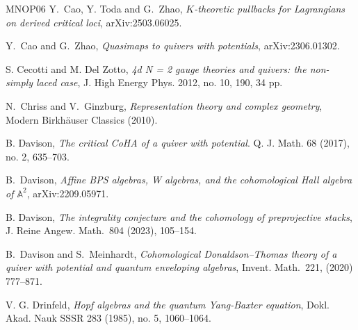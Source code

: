 \documentclass[10pt]{amsart}
\theoremstyle{definition}
\numberwithin{equation}{section}
\begin{document}
\begin{thebibliography}{MNOP06}
 Y.~Cao, Y. Toda and G.~Zhao, \textit{$K$-theoretic pullbacks for Lagrangians on derived critical loci}, arXiv:2503.06025.


 Y.~Cao and G.~Zhao, \textit{Quasimaps to quivers with potentials}, arXiv:2306.01302. 



 S. Cecotti and M. Del Zotto, \textit{4d N = 2 gauge theories and quivers: the non-simply laced case}, J. High Energy Phys. 2012, no. 10, 190, 34 pp.


 N.~Chriss and V.~Ginzburg, \textit{Representation theory and complex geometry}, Modern Birkh\"auser Classics (2010).



B. Davison, \textit{The critical CoHA of a quiver with potential}. Q. J. Math. 68 (2017), no. 2, 635--703. 

 B.~Davison, \textit{Affine BPS algebras, W algebras, and the cohomological Hall algebra of $\mathbb {A}^2$}, arXiv:2209.05971.

 B. Davison, \textit{The integrality conjecture and the cohomology of preprojective stacks}, J. Reine Angew. Math.~804 (2023), 105--154.




 B.~Davison and S.~Meinhardt, \textit{Cohomological Donaldson–Thomas theory of a quiver with potential and quantum enveloping algebras}, Invent. Math.~221, (2020) 777--871.


V. G. Drinfeld, \textit{Hopf algebras and the quantum Yang-Baxter equation}, Dokl. Akad. Nauk SSSR
283 (1985), no. 5, 1060--1064.







\end{thebibliography}
\end{document}
